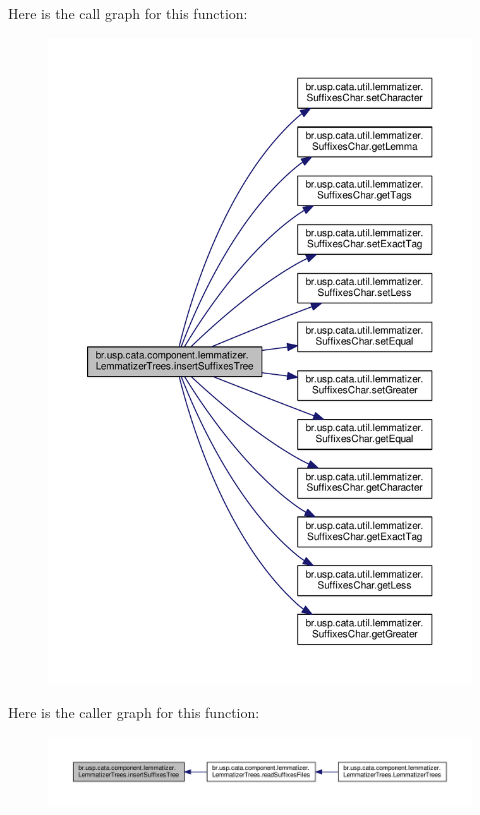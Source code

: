 Here is the call graph for this function\+:\nopagebreak
\begin{figure}[H]
\begin{center}
\leavevmode
\includegraphics[width=350pt]{classbr_1_1usp_1_1cata_1_1component_1_1lemmatizer_1_1_lemmatizer_trees_a441d84baf8fcf596911def5de2cd9b84_cgraph}
\end{center}
\end{figure}




Here is the caller graph for this function\+:\nopagebreak
\begin{figure}[H]
\begin{center}
\leavevmode
\includegraphics[width=350pt]{classbr_1_1usp_1_1cata_1_1component_1_1lemmatizer_1_1_lemmatizer_trees_a441d84baf8fcf596911def5de2cd9b84_icgraph}
\end{center}
\end{figure}


